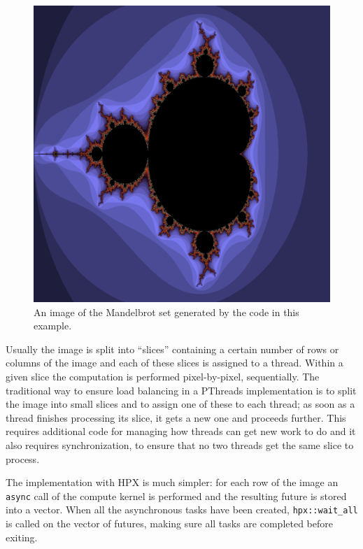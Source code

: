 \begin{figure}[h]
 	\begin{center}
 		\includegraphics[scale=0.2]{Figures/mandelbrot.png}
 		\caption{An image of the Mandelbrot set generated by the code in this example.}
 		\label{fig:mandelbrotSet}
 	\end{center}
\end{figure}

Usually the image is split into ``slices'' containing a certain number of rows or columns of the image and each of these slices is assigned to a thread. Within a given slice the computation is performed pixel-by-pixel, sequentially.
The traditional way to ensure load balancing in a PThreads implementation is to split the image into small slices and to assign one of these to each thread; as soon as a thread finishes processing its slice, it gets a new one and proceeds further.
This requires additional code for managing how threads can get new work to do and it also requires synchronization, to ensure that no two threads get the same slice to process.

The implementation with HPX is much simpler: for each row of the image an \verb:async: call of the compute kernel is performed and the resulting future is stored into a vector. When all the asynchronous tasks have been created, \verb+hpx::wait_all+ is called on the vector of futures, making sure all tasks are completed before exiting.

